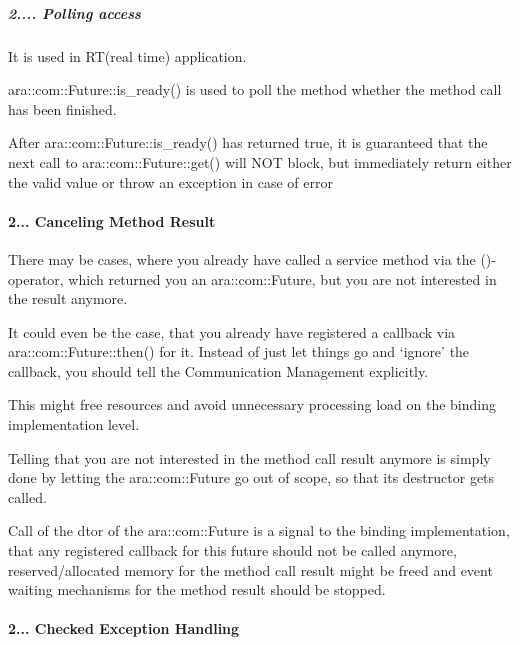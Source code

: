 \subparagraph*{2.... Polling access}


\begin{DoxyItemize}
\item It is used in R\+T(real time) application.
\item ara\+::com\+::\+Future\+::is\+\_\+ready() is used to poll the method whether the method call has been finished.
\item After ara\+::com\+::\+Future\+::is\+\_\+ready() has returned true, it is guaranteed that the next call to ara\+::com\+::\+Future\+::get() will N\+OT block, but immediately return either the valid value or throw an exception in case of error
\end{DoxyItemize}

\paragraph*{2... Canceling Method Result}


\begin{DoxyItemize}
\item There may be cases, where you already have called a service method via the ()-\/ operator, which returned you an ara\+::com\+::\+Future, but you are not interested in the result anymore.
\item It could even be the case, that you already have registered a callback via ara\+::com\+::\+Future\+::then() for it. Instead of just let things go and ‘ignore’ the callback, you should tell the Communication Management explicitly.
\item This might free resources and avoid unnecessary processing load on the binding implementation level.
\item Telling that you are not interested in the method call result anymore is simply done by letting the ara\+::com\+::\+Future go out of scope, so that its destructor gets called.
\item Call of the dtor of the ara\+::com\+::\+Future is a signal to the binding implementation, that any registered callback for this future should not be called anymore, reserved/allocated memory for the method call result might be freed and event waiting mechanisms for the method result should be stopped.
\end{DoxyItemize}

\paragraph*{2... Checked Exception Handling}


